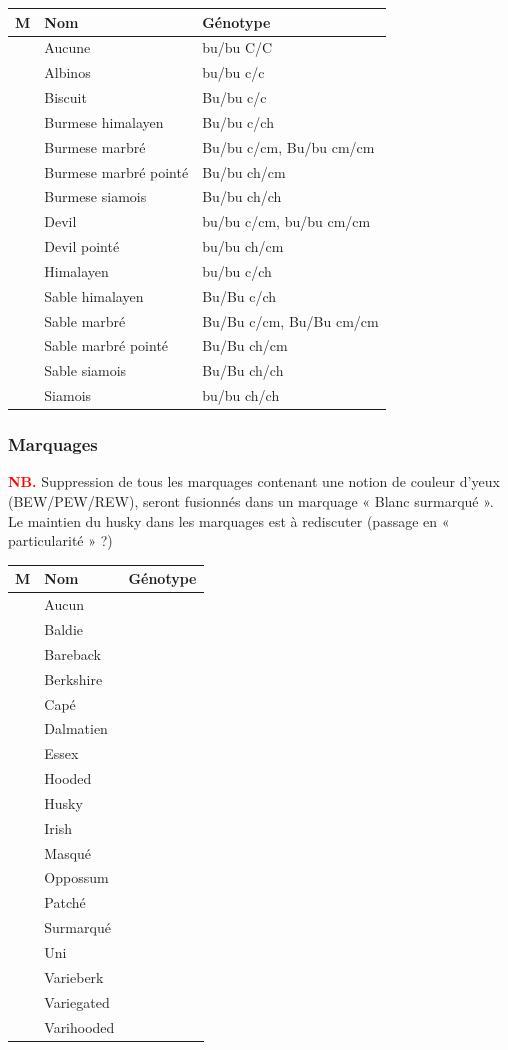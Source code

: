 ﻿\documentclass[a4paper,10pt]{article}
\newcommand\desire[1]{\noindent\textbf{\textcolor{red}{#1}}}
\begin{document}
\begin{longtable}{|c|l|l|}\hline
\textbf{M} & \textbf{Nom} & \textbf{Génotype} \\\hline
 &  Aucune & bu/bu C/C \\\hline
 &  Albinos & bu/bu c/c \\\hline
 &  Biscuit & Bu/bu c/c \\\hline
 &  Burmese himalayen & Bu/bu c/ch \\\hline
 &  Burmese marbré & Bu/bu c/cm, Bu/bu cm/cm  \\\hline
 &  Burmese marbré pointé & Bu/bu ch/cm \\\hline
 &  Burmese siamois & Bu/bu ch/ch \\\hline
 &  Devil & bu/bu c/cm, bu/bu cm/cm \\\hline
 &  Devil pointé & bu/bu ch/cm \\\hline
 &  Himalayen & bu/bu c/ch \\\hline
 &  Sable himalayen & Bu/Bu c/ch \\\hline
 &  Sable marbré & Bu/Bu c/cm, Bu/Bu cm/cm \\\hline
 &  Sable marbré pointé & Bu/Bu ch/cm \\\hline
 &  Sable siamois & Bu/Bu ch/ch \\\hline
 &  Siamois & bu/bu ch/ch \\\hline
\end{longtable}

\subsubsection{Marquages}
\desire{NB.} Suppression de tous les marquages contenant une notion de couleur d’yeux (BEW/PEW/REW), seront fusionnés dans un marquage « Blanc surmarqué ». Le maintien du husky dans les marquages est à rediscuter (passage en « particularité » ?)  

\begin{longtable}{|c|l|l|}\hline
\textbf{M} & \textbf{Nom} & \textbf{Génotype} \\\hline
\endhead
 &  Aucun & \\\hline
 &  Baldie & \\\hline
 &  Bareback & \\\hline
 &  Berkshire & \\\hline
 &  Capé & \\\hline
 &  Dalmatien & \\\hline
 &  Essex & \\\hline
 &  Hooded & \\\hline
 &  Husky & \\\hline
 &  Irish & \\\hline
 &  Masqué & \\\hline
 &  Oppossum & \\\hline
 &  Patché & \\\hline
 &  Surmarqué & \\\hline
 &  Uni & \\\hline
 &  Varieberk & \\\hline
 &  Variegated & \\\hline
 &  Varihooded & \\\hline
\end{longtable}
\end{document}
